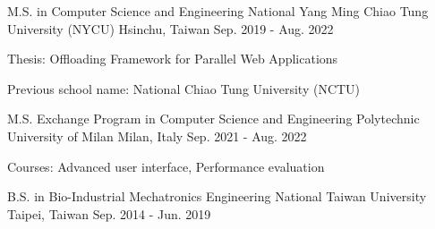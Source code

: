 

\begin{cventries}

  
\cventry
  {M.S. in Computer Science and Engineering} %
  {National Yang Ming Chiao Tung University (NYCU)} %
  {Hsinchu, Taiwan} %
  {Sep. 2019 - Aug. 2022} %
  {
    \begin{cvitems} %
      \item {Thesis: Offloading Framework for Parallel Web Applications}
      \item {Previous school name: National Chiao Tung University (NCTU)}
    \end{cvitems}
  }

\cventry
    {M.S. Exchange Program in Computer Science and Engineering} %
    {Polytechnic University of Milan} %
    {Milan, Italy} %
    {Sep. 2021 - Aug. 2022} %
    {
      \begin{cvitems} %
        \item {Courses: Advanced user interface, Performance evaluation}
      \end{cvitems}
    }

  \cventry
    {B.S. in Bio-Industrial Mechatronics Engineering} %
    {National Taiwan University} %
    {Taipei, Taiwan} %
    {Sep. 2014 - Jun. 2019} %
    {
      \begin{cvitems} %
      \end{cvitems}
    }

\end{cventries}
